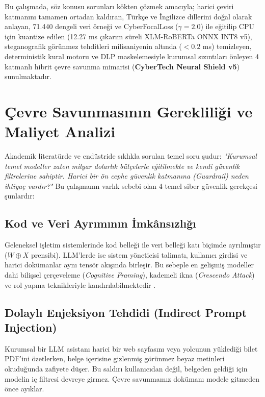 \documentclass[conference]{IEEEtran}
\begin{document}
Bu çalışmada, söz konusu sorunları kökten çözmek amacıyla; harici çeviri katmanını tamamen ortadan kaldıran, Türkçe ve İngilizce dillerini doğal olarak anlayan, 71.440 dengeli veri örneği ve CyberFocalLoss ($\gamma=2.0$) ile eğitilip CPU için kuantize edilen (12.27 ms çıkarım süreli XLM-RoBERTa ONNX INT8 v5), steganografik görünmez tehditleri milisaniyenin altında ($<0.2$ ms) temizleyen, deterministik kural motoru ve DLP maskelemesiyle kurumsal sızıntıları önleyen 4 katmanlı hibrit çevre savunma mimarisi (\textbf{CyberTech Neural Shield v5}) sunulmaktadır.

\section{Çevre Savunmasının Gerekliliği ve Maliyet Analizi}
Akademik literatürde ve endüstride sıklıkla sorulan temel soru şudur: \textit{"Kurumsal temel modeller zaten milyar dolarlık bütçelerle eğitilmekte ve kendi güvenlik filtrelerine sahiptir. Harici bir ön cephe güvenlik katmanına (Guardrail) neden ihtiyaç vardır?"} Bu çalışmanın varlık sebebi olan 4 temel siber güvenlik gerekçesi şunlardır:

\subsection{Kod ve Veri Ayrımının İmkânsızlığı}
Geleneksel işletim sistemlerinde kod belleği ile veri belleği katı biçimde ayrılmıştır ($W \oplus X$ prensibi). LLM'lerde ise sistem yöneticisi talimatı, kullanıcı girdisi ve harici dokümanlar aynı tensör akışında birleşir. Bu sebeple en gelişmiş modeller dahi bilişsel çerçeveleme (\textit{Cognitive Framing}), kademeli ikna (\textit{Crescendo Attack}) ve rol yapma teknikleriyle kandırılabilmektedir \cite{zou2023}.

\subsection{Dolaylı Enjeksiyon Tehdidi (Indirect Prompt Injection)}
Kurumsal bir LLM asistanı harici bir web sayfasını veya yolcunun yüklediği bilet PDF'ini özetlerken, belge içerisine gizlenmiş görünmez beyaz metinleri okuduğunda zafiyete düşer. Bu saldırı kullanıcıdan değil, belgeden geldiği için modelin iç filtresi devreye girmez. Çevre savunmamız dokümanı modele gitmeden önce ayıklar.
\end{document}
